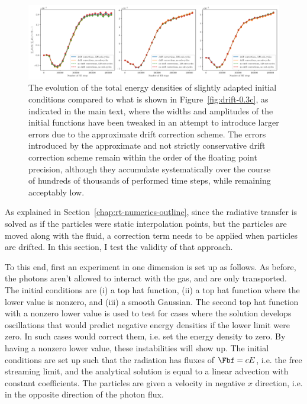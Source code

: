 \begin{figure}
 \centering
 \includegraphics[width=\textwidth]{figures/RHD/drift/energy_comparison.png}%
 \caption{
The evolution of the total energy densities of slightly adapted initial conditions compared to
what is shown in Figure~\ref{fig:drift-0.3c}, as indicated in the main text, where the widths and
amplitudes of the initial functions have been tweaked in an attempt to introduce larger errors due
to the approximate drift correction scheme. The errors introduced by the approximate and not strictly conservative drift correction scheme remain within the order of the floating point precision, although they accumulate systematically over the course of hundreds of thousands of performed time steps, while remaining acceptably low.
 }
 \label{fig:drift-correction-conservation}
\end{figure}







As explained in Section~\ref{chap:rt-numerics-outline}, since the radiative transfer is solved as if
the particles were static interpolation points, but the particles are moved along with the fluid, a
correction term needs to be applied when particles are drifted. In this section, I test the validity
of that approach.

To this end, first an experiment in one dimension is set up as follows. As before, the photons
aren't allowed to interact with the gas, and are only transported. The initial conditions are (i) a
top hat function, (ii) a top hat function where the lower value is nonzero, and (iii) a smooth
Gaussian. The second top hat function with a nonzero lower value is used to test for cases where the
solution develops oscillations that would predict negative energy densities if the lower limit were
zero. In such cases \GEARRT would correct them, i.e. set the energy density to zero. By having a
nonzero lower value, these instabilities will show up.
The initial conditions are set up such that the radiation has fluxes of $\Fbf = c E$, i.e. the free
streaming limit, and the analytical solution is equal to a linear advection with constant
coefficients. The particles are given a velocity in negative $x$ direction, i.e. in the opposite
direction of the photon flux.


